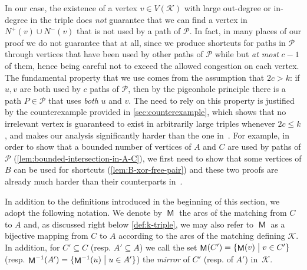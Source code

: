 \documentclass[a4paper,UKenglish,cleveref, autoref, thm-restate]{lipics-v2021}
\DeclareMathOperator{\Mat}{\mathsf M}
\renewcommand{\mid}{\bigm|}
\begin{document}
In our case, the existence of a vertex $v \in V(\mathcal{K})$ with large out-degree or
in-degree in the triple does {\sl not} guarantee that we can find a vertex in $N^+(v) \cup
N^-(v)$ that is not used by a path of $\mathcal{P}$.
In fact, in many places of our proof we do not guarantee that at all, since we produce
shortcuts for paths in $\mathcal{P}$ through vertices that have been used by other paths
of $\mathcal{P}$ while but \textsl{at most} $c-1$ of them, hence being careful not to exceed the allowed congestion on each vertex.
The fundamental property that we use comes from the assumption that $2c > k$: if $u,v$
are both used by $c$ paths of $\mathcal{P}$, then by the pigeonhole principle there is a path $P \in \mathcal{P}$ that
uses \textsl{both} $u$ and $v$.
The need to rely on this property is justified by the counterexample provided in  \autoref{sec:counterexample}, which shows that no irrelevant vertex is guaranteed
to exist in arbitrarily large triples whenever $2c \leq k$, and makes our analysis
significantly harder than the one in~\cite{FominP19}.
For example, in order to show that a bounded number of vertices of $A$ and $C$ are used
by paths of $\mathcal{P}$ (\autoref{lem:bounded-intersection-in-A-C}), we first need to show that some vertices of $B$ can be
used for shortcuts (\autoref{lem:B-xor-free-pair}) and these two proofs are already much harder than their counterparts
in~\cite{FominP19}.



\medskip
In addition to the definitions introduced in the beginning of this section, we adopt the following notation.
We denote by $\Mat$ the arcs of the matching from $C$ to $A$ and, as discussed
right below \autoref{def:k-triple}, we may also
refer to $\Mat$ as a bijective mapping from $C$ to $A$ according to the arcs of
the matching defining $\mathcal{K}$.
In addition, for $C' \subseteq C$ (resp. $A' \subseteq A$) we call the set $\Mat(C') =
\{\Mat(v) \mid v \in C'\}$ (resp. $\Mat^{-1}(A') = \{\Mat^{-1}(u) \mid u \in A'\}$) the
\emph{mirror} of $C'$ (resp. of $A'$) in~$\mathcal{K}$.
\end{document}
